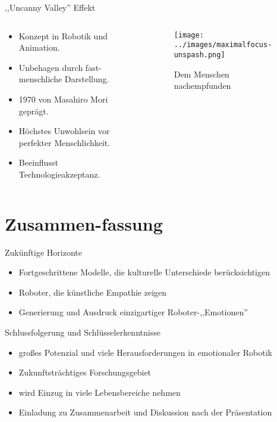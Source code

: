 \documentclass[aspectratio=169]{beamer}
\begin{document}
\begin{frame}{,,Uncanny Valley'' Effekt}
  \begin{columns}
    \begin{column}{0.7\textwidth}
      \begin{itemize}
        \item Konzept in Robotik und Animation.
        \item Unbehagen durch fast-menschliche Darstellung.
        \item 1970 von Masahiro Mori geprägt.
        \item Höchstes Unwohlsein vor perfekter Menschlichkeit.
        \item Beeinflusst Technologieakzeptanz.
      \end{itemize}
    \end{column}
    \begin{column}{0.3\textwidth}
      \begin{figure}[h]
        \centering
        \texttt{[image: ../images/maximalfocus-unspash.png]}
        \caption{Dem Menschen nachempfunden}
      \end{figure}
    \end{column}
  \end{columns}
\end{frame}

\section{Zusammen-fassung}
\begin{frame}{Zukünftige Horizonte}
  \begin{itemize}
    \item Fortgeschrittene Modelle, die kulturelle Unterschiede berücksichtigen
    \item Roboter, die künstliche Empathie zeigen
    \item Generierung und Ausdruck einzigartiger Roboter-,,Emotionen''
  \end{itemize}
\end{frame}
\begin{frame}{Schlussfolgerung und Schlüsselerkenntnisse}
  \begin{itemize}
    \item großes Potenzial und viele Herausforderungen in emotionaler Robotik
    \item Zukunftsträchtiges Forschungsgebiet
    \item wird Einzug in viele Lebensbereiche nehmen
    \item Einladung zu Zusammenarbeit und Diskussion nach der Präsentation
  \end{itemize}
\end{frame}
\end{document}
